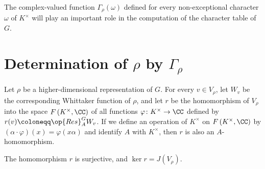 \documentclass[../main.tex]{subfiles}
\begin{document}
The complex-valued function $\Gamma_\rho(\omega)$ defined for every non-exceptional character $\omega$ of $K^\times$ will play an important role in the computation of the character table of $G$.

\section{Determination of \texorpdfstring{$\rho$}{ rho} by \texorpdfstring{$\Gamma_\rho$}{ Gamma rho}}
Let $\rho$ be a higher-dimensional representation of $G$. For every $v\in V_\rho$, let $W_v$ be the corresponding Whittaker function of $\rho$, and let $r$ be the homomorphism of $V_\rho$ into the space $F\left(K^\times,\CC\right)$ of all functions $\varphi\colon K^\times\to\CC$ defined by $r(v)\coloneqq\op{Res}_A^GW_v$. If we define an operation of $K^\times$ on $F\left(K^\times,\CC\right)$ by $(\alpha\cdot\varphi)(x)=\varphi(x\alpha)$ and identify $A$ with $K^\times$, then $r$ is also an $A$-homomorphism.
\begin{lemma} \label{lem:ker-r-computation}
	The homomorphism $r$ is surjective, and $\ker r=J(V_\rho)$.
\end{lemma}
\end{document}
